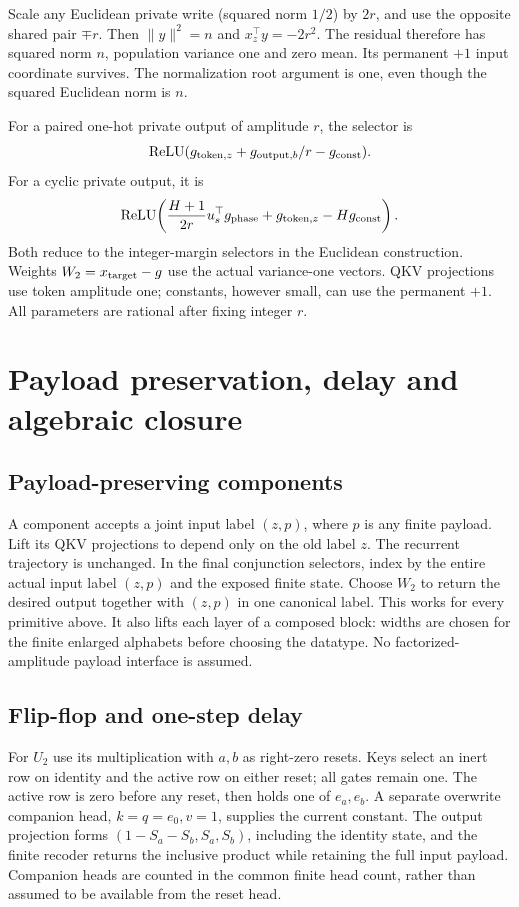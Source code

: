 \documentclass[10pt]{article}
\theoremstyle{remark}
\newcommand{\relu}{\operatorname{ReLU}}
\begin{document}
Scale any Euclidean private write (squared norm $1/2$) by $2r$, and use the
opposite shared pair $\mp r$. Then $\|y\|^2=n$ and $x_z^\top y=-2r^2$.
The residual therefore has squared norm $n$, population variance one and
zero mean. Its permanent $+1$ input coordinate survives. The normalization
root argument is one, even though the squared Euclidean norm is $n$.

For a paired one-hot private output of amplitude $r$, the selector is
\[
 \relu(g_{{\rm token},z}+g_{{\rm output},b}/r-g_{{\rm const}}).
\]
For a cyclic private output, it is
\[
 \relu\!\left(\frac{H+1}{2r}u_s^\top g_{\rm phase}
                    +g_{{\rm token},z}-H g_{{\rm const}}\right).
\]
Both reduce to the integer-margin selectors in the Euclidean construction.
Weights $W_2=x_{\rm target}-g$ use the actual variance-one vectors. QKV
projections use token amplitude one; constants, however small, can use the
permanent $+1$. All parameters are rational after fixing integer $r$.

\section{Payload preservation, delay and algebraic closure}\label{app:closure}
\subsection{Payload-preserving components}
A component accepts a joint input label $(z,p)$, where $p$ is any finite
payload. Lift its QKV projections to depend only on the old label $z$.
The recurrent trajectory is unchanged. In the final conjunction selectors,
index by the entire actual input label $(z,p)$ and the exposed finite state.
Choose $W_2$ to return the desired output together with $(z,p)$ in one
canonical label. This works for every primitive above. It also lifts each
layer of a composed block: widths are chosen for the finite enlarged alphabets
before choosing the datatype. No factorized-amplitude payload interface is
assumed.

\subsection{Flip-flop and one-step delay}
For $U_2$ use its multiplication with $a,b$ as right-zero resets. Keys select
an inert row on identity and the active row on either reset; all gates remain
one. The active row is zero before any reset, then holds one of $e_a,e_b$.
A separate overwrite companion head, $k=q=e_0,v=1$, supplies the current
constant. The output projection forms $(1-S_a-S_b,S_a,S_b)$, including the
identity state, and the finite recoder returns the inclusive product while
retaining the full input payload. Companion heads are counted in the common
finite head count, rather than assumed to be available from the reset head.
\end{document}
